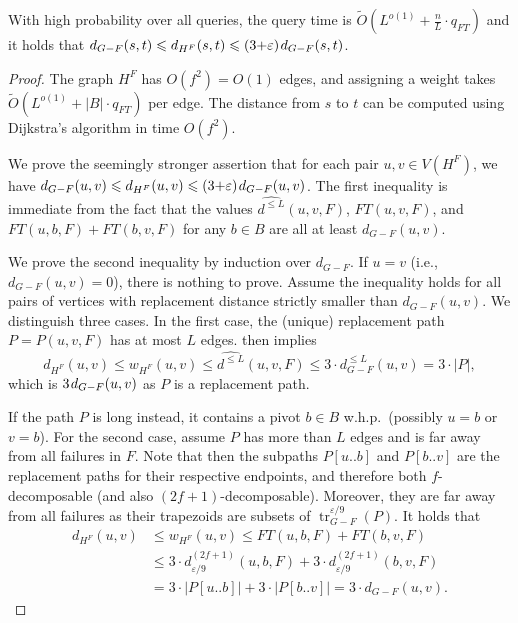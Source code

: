 \documentclass{article}\usepackage[a4paper,margin=20mm]{geometry}
\DeclareMathOperator{\tr}{tr}
\newcommand*{\Otilde}{\widetilde{O}}
\newcommand*{\length}[1]{|#1|}
\newcommand*{\nwspace}{\hspace*{.1em}}
\renewcommand{\le}{\leqslant}
\newcommand{\eps}{\varepsilon}
\begin{document}
\begin{lemma}
\label{lem:sublinear_query}
  With high probability over all queries, the query time is
  $\Otilde(L^{o(1)} + \frac{n}{L} \cdot q_{FT})$
  and it holds that
  $d_{G-F}(s,t) \le d_{H^F}(s,t) \le (3{+}\eps) \nwspace d_{G-F}(s,t)$. 
\end{lemma}

\begin{proof}
  The graph $H^F$ has $O(f^2) = O(1)$ edges, 
  and assigning a weight takes $\Otilde(L^{o(1)} + |B| \cdot q_{FT})$ per edge.
  The distance from $s$ to $t$ can be computed using Dijkstra's algorithm in time $O(f^2)$.
  
  We prove the seemingly stronger assertion that for each pair $u,v \in V(H^F)$,
  we have $d_{G-F}(u,v) \le d_{H^F}(u,v) \le (3{+}\eps) \nwspace d_{G-F}(u,v)$.
  The first inequality is immediate from the fact that the values 
  $\widehat{d^{\le L}}(u,v,F)$, $FT(u,v,F)$, and $FT(u,b,F) + FT(b,v,F)$ for any $b \in B$
  are all at least $d_{G-F}(u,v)$.
  
  We prove the second inequality by induction over $d_{G-F}$.
  If $u = v$ (i.e., $d_{G-F}(u,v) = 0$), there is nothing to prove.
  Assume the inequality holds for all pairs of vertices with replacement distance
  strictly smaller than $d_{G-F}(u,v)$.
  We distinguish three cases.
  In the first case, the (unique)
  replacement path $P = P(u,v,F)$ has at most $L$ edges.
   then implies
  \begin{equation*}
    d_{H^F}(u,v) \le w_{H^F}(u,v) \le \widehat{d^{\le L}}(u,v,F)
      \le 3 \cdot d_{G-F}^{\le L}(u,v) = 3 \cdot \length{P},
  \end{equation*}
  which is $3 \nwspace d_{G-F}(u,v)$ as $P$ is a replacement path.

  If the path $P$ is long instead,
  it contains a pivot $b \in B$ w.h.p.\ (possibly $u = b$ or $v = b$).
  For the second case, assume $P$ has more than $L$ edges and is far away from all failures in $F$.
  Note that then the subpaths $P[u..b]$ and $P[b..v]$ are the replacement paths
  for their respective endpoints,
  and therefore both $f$-decomposable (and also $(2f{+}1)$-decomposable).
  Moreover, they are far away from all failures
  as their trapezoids are subsets of $\tr^{\eps/9}_{G-F}(P)$.
  It holds that
  \begin{align*}
    d_{H^F}(u,v) &\le w_{H^F}(u,v) \le FT(u,b,F) + FT(b,v,F)\\
      &\le 3 \cdot d^{(2f+1)}_{\eps/9}(u,b,F)
        + 3 \cdot d^{(2f+1)}_{\eps/9}(b,v,F)\\
      &= 3 \cdot \length{P[u..b]}
        + 3 \cdot \length{P[b..v]}
      = 3 \cdot d_{G-F}(u,v). 
  \end{align*}  
  

\end{proof}
\end{document}
